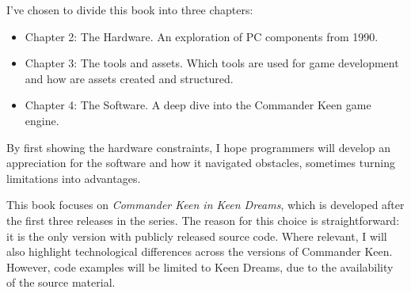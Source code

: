 \documentclass[book.tex]{subfiles}
\begin{document}
\par
I've chosen to divide this book into three chapters:
\begin{itemize}
  \item Chapter 2: The Hardware. An exploration of PC components from 1990.
  \item Chapter 3: The tools and assets. Which tools are used for game development and how are assets created and structured.
  \item Chapter 4: The Software. A deep dive into the Commander Keen game engine.

\end{itemize}
By first showing the hardware constraints, I hope programmers will develop an appreciation for the software and how it navigated obstacles, sometimes turning limitations into advantages.\\

\par
This book focuses on \textit{Commander Keen in Keen Dreams}, which is developed after the first three releases in the series. The reason for this choice is straightforward: it is the only version with publicly released source code. Where relevant, I will also highlight technological differences across the versions of Commander Keen. However, code examples will be limited to Keen Dreams, due to the availability of the source material.\\
\end{document}
